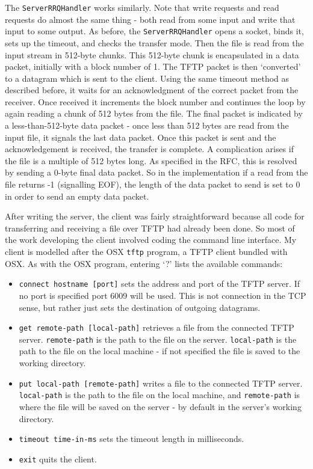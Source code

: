 \documentclass[a4paper]{article}
\newcommand{\code}{\texttt}
\begin{document}
The \code{ServerRRQHandler} works similarly. Note that write requests and read requests do almost the same thing - both read from some input and write that input to some output. As before, the \code{ServerRRQHandler} opens a socket, binds it, sets up the timeout, and checks the transfer mode. Then the file is read from the input stream in 512-byte chunks. This 512-byte chunk is encapsulated in a data packet, initially with a block number of 1. The TFTP packet is then `converted' to a datagram which is sent to the client. Using the same timeout method as described before, it waits for an acknowledgment of the correct packet from the receiver. Once received it increments the block number and continues the loop by again reading a chunk of 512 bytes from the file. The final packet is indicated by a less-than-512-byte data packet - once less than 512 bytes are read from the input file, it signals the last data packet. Once this packet is sent and the acknowledgement is received, the transfer is complete. A complication arises if the file is a multiple of 512 bytes long. As specified in the RFC, this is resolved by sending a 0-byte final data packet. So in the implementation if a read from the file returns -1 (signalling EOF), the length of the data packet to send is set to 0 in order to send an empty data packet.

After writing the server, the client was fairly straightforward because all code for transferring and receiving a file over TFTP had already been done. So most of the work developing the client involved coding the command line interface. My client is modelled after the OSX \code{tftp} program, a TFTP client bundled with OSX. As with the OSX program, entering `?' lists the available commands:
\begin{itemize}
\item \code{connect hostname [port]} sets the address and port of the TFTP server. If no port is specified port 6009 will be used. This is not connection in the TCP sense, but rather just sets the destination of outgoing datagrams.
\item \code{get remote-path [local-path]} retrieves a file from the connected TFTP server. \code{remote-path} is the path to the file on the server. \code{local-path} is the path to the file on the local machine - if not specified the file is saved to the working directory. 
\item \code{put local-path [remote-path]} writes a file to the connected TFTP server. \code{local-path} is the path to the file on the local machine, and \code{remote-path} is where the file will be saved on the server - by default in the server's working directory.
\item \code{timeout time-in-ms} sets the timeout length in milliseconds.
\item \code{exit} quits the client.
\end{itemize}
\end{document}

